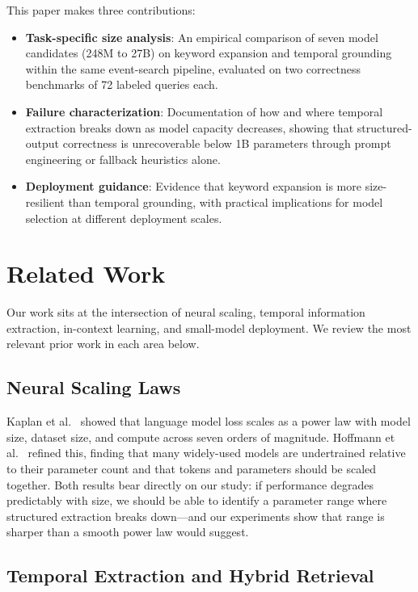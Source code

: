 \documentclass[conference]{IEEEtran}
\begin{document}
This paper makes three contributions:
\begin{itemize}
    \item \textbf{Task-specific size analysis}: An empirical comparison of seven model candidates (248M to 27B) on keyword expansion and temporal grounding within the same event-search pipeline, evaluated on two correctness benchmarks of 72 labeled queries each.
    \item \textbf{Failure characterization}: Documentation of how and where temporal extraction breaks down as model capacity decreases, showing that structured-output correctness is unrecoverable below 1B parameters through prompt engineering or fallback heuristics alone.
    \item \textbf{Deployment guidance}: Evidence that keyword expansion is more size-resilient than temporal grounding, with practical implications for model selection at different deployment scales.
\end{itemize}

\section{Related Work}
\label{sec:related}

Our work sits at the intersection of neural scaling, temporal information extraction, in-context learning, and small-model deployment. We review the most relevant prior work in each area below.

\subsection{Neural Scaling Laws}

Kaplan et al.~\cite{kaplan2020scaling} showed that language model loss scales as a power law with model size, dataset size, and compute across seven orders of magnitude. Hoffmann et al.~\cite{hoffmann2022training} refined this, finding that many widely-used models are undertrained relative to their parameter count and that tokens and parameters should be scaled together. Both results bear directly on our study: if performance degrades predictably with size, we should be able to identify a parameter range where structured extraction breaks down---and our experiments show that range is sharper than a smooth power law would suggest.

\subsection{Temporal Extraction and Hybrid Retrieval}
\end{document}
